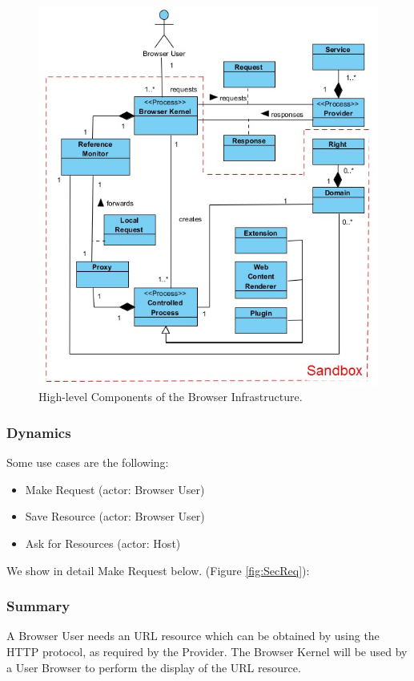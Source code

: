 \documentclass{sig-alternate-05-2015}
\begin{document}
    \begin{figure}[h!t]
      \centering
      \includegraphics[scale=0.80]{figures/patron_v8.jpg}
      \caption{High-level Components of the Browser Infrastructure.}
      \label{fig:BIPatt}
    \end{figure}

    \subsubsection*{Dynamics}
    Some use cases are the following:
    \begin{itemize}
      \item Make Request (actor: Browser User)
      \item Save Resource (actor: Browser User)
      \item Ask for Resources (actor: Host)
    \end{itemize}
    We show in detail Make Request below. (Figure \ref{fig:SecReq}):
    \subsubsection*{Summary} A Browser User needs an URL resource which can be obtained by using the HTTP protocol, as required by the Provider. The Browser Kernel will be used by a User Browser to perform the display of the URL resource.
\end{document}
